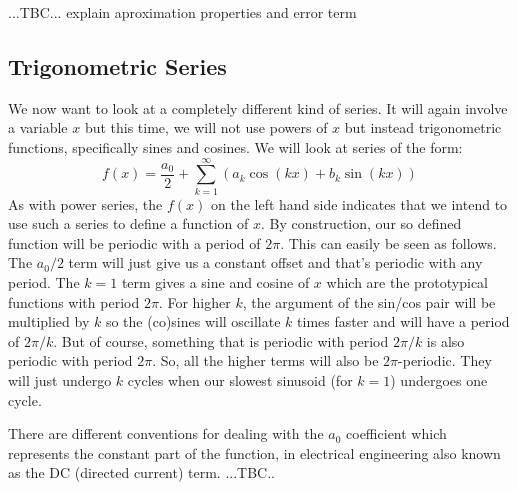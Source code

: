 \medskip
...TBC... explain aproximation properties and error term





\subsection{Trigonometric Series}
We now want to look at a completely different kind of series. It will again involve a variable $x$ but this time, we will not use powers of $x$ but instead trigonometric functions, specifically sines and cosines. We will look at series of the form:
\begin{equation}
\label{Eq:FourierSeries}
 f(x) = \frac{a_0}{2} + \sum_{k=1}^\infty \left(  a_k \cos(k x) + b_k \sin(k x) \right)
\end{equation}
As with power series, the $f(x)$ on the left hand side indicates that we intend to use such a series to define a function of $x$. By construction, our so defined function will be periodic with a period of $2\pi$. This can easily be seen as follows. The $a_0/2$ term will just give us a constant offset and that's periodic with any period. The $k=1$ term gives a sine and cosine of $x$ which are the prototypical functions with period $2\pi$. For higher $k$, the argument of the sin/cos pair will be multiplied by $k$ so the (co)sines will oscillate $k$ times faster and will have a period of $2\pi/k$. But of course, something that is periodic with period $2\pi/k$ is also periodic with period $2\pi$. So, all the higher terms will also be $2\pi$-periodic. They will just undergo $k$ cycles when our slowest sinusoid (for $k=1$) undergoes one cycle.

\medskip
There are different conventions for dealing with the $a_0$ coefficient which represents the constant part of the function, in electrical engineering also known as the DC (directed current) term. ...TBC..


